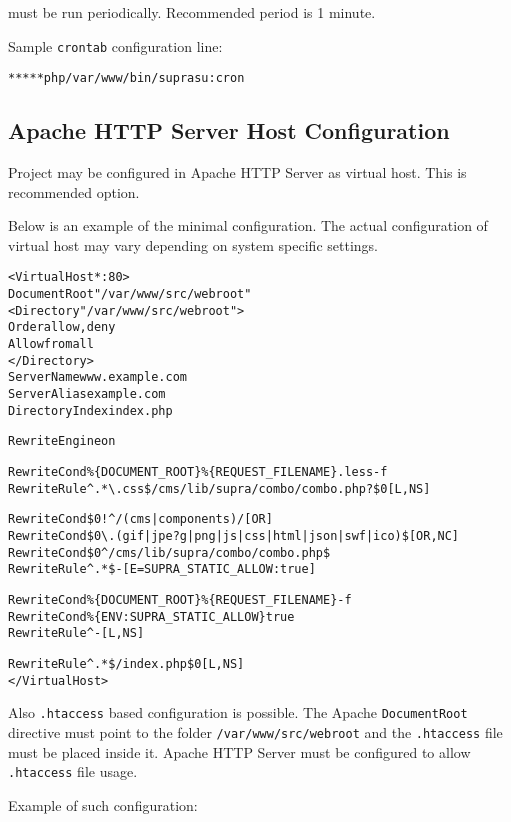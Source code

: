 \documentclass[12pt]{article}
\newcommand{\vigPathToProject}{/var/www}
\newcommand{\vigPathToSrc}{/src}
\newcommand{\vigPathToWebroot}{\vigPathToSrc/webroot}
\begin{document}
must be run periodically. Recommended period is 1 minute.

Sample \texttt{crontab} configuration line:

\begin{alltt}
* * * * * php \vigPathToProject/bin/supra su:cron
\end{alltt}

\subsection{Apache HTTP Server Host Configuration}

Project may be configured in Apache HTTP Server as virtual host. This is recommended option.

Below is an example of the minimal configuration. The actual configuration of virtual host may vary depending on system specific settings.

\begin{alltt}
<VirtualHost *:80>
  DocumentRoot "\vigPathToProject\vigPathToWebroot"
  <Directory "\vigPathToProject\vigPathToWebroot">
    Order allow,deny
    Allow from all
  </Directory>
  ServerName www.example.com
  ServerAlias example.com
  DirectoryIndex index.php

  RewriteEngine on

  RewriteCond \%\{DOCUMENT_ROOT\}\%\{REQUEST_FILENAME\}.less -f
  RewriteRule ^.*{\textbackslash}.css\$ /cms/lib/supra/combo/combo.php?\$0 [L,NS]
  
  RewriteCond \$0 !^/(cms|components)/ [OR]
  RewriteCond \$0 {\textbackslash}.(gif|jpe?g|png|js|css|html|json|swf|ico)\$ [OR,NC]
  RewriteCond \$0 ^/cms/lib/supra/combo/combo.php\$
  RewriteRule ^.*\$ - [E=SUPRA_STATIC_ALLOW:true]
  
  RewriteCond \%\{DOCUMENT_ROOT\}\%\{REQUEST_FILENAME\} -f
  RewriteCond \%\{ENV:SUPRA_STATIC_ALLOW\} true
  RewriteRule ^ - [L,NS]
  
  RewriteRule ^.*\$ /index.php\$0 [L,NS]
</VirtualHost>
\end{alltt}

Also \texttt{.htaccess} based configuration is possible. The Apache \texttt{DocumentRoot} directive must point to the folder \texttt{\vigPathToProject\vigPathToWebroot} and the \texttt{.htaccess} file must be placed inside it. Apache HTTP Server must be configured to allow \texttt{.htaccess} file usage.

Example of such configuration:

\begin{alltt}

\end{alltt}
\end{document}
